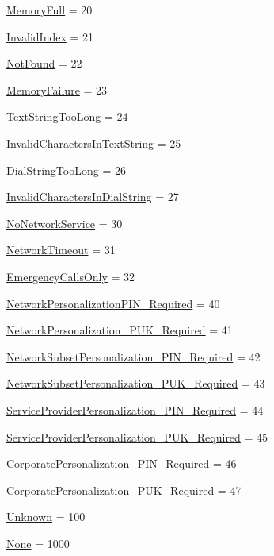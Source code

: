 \begin{DoxyCompactItemize}
\hyperlink{enum_8vala_a9c4b821e98068d17ab433a2059b86e65}{Memory\-Full} = 20
\item 
\hyperlink{enum_8vala_ad0eb959f723fbb1fde28d6c5f38f2bd7}{Invalid\-Index} = 21
\item 
\hyperlink{enum_8vala_a0cfc295e037d42309933d7471dcfd28e}{Not\-Found} = 22
\item 
\hyperlink{enum_8vala_a2a58ed09b8a8239b15d3a0e0c365c029}{Memory\-Failure} = 23
\item 
\hyperlink{enum_8vala_a98dcfca4d65c0e143c59a9669ea21787}{Text\-String\-Too\-Long} = 24
\item 
\hyperlink{enum_8vala_a6d5934c08a338c23fbf114f99193ec68}{Invalid\-Characters\-In\-Text\-String} = 25
\item 
\hyperlink{enum_8vala_a1d8e3c259a652e59cebc60a29ac496c5}{Dial\-String\-Too\-Long} = 26
\item 
\hyperlink{enum_8vala_a944e825978407f13a694783f06264b84}{Invalid\-Characters\-In\-Dial\-String} = 27
\item 
\hyperlink{enum_8vala_a941770a50c4e4f7a763fe278de42596a}{No\-Network\-Service} = 30
\item 
\hyperlink{enum_8vala_a4ab8d67ce74f17111c2c63028b724909}{Network\-Timeout} = 31
\item 
\hyperlink{enum_8vala_ad257fe2f6eb1d34148dad08c271622cd}{Emergency\-Calls\-Only} = 32
\item 
\hyperlink{enum_8vala_ac89259fa0400e5b5fca481767b0d5f2a}{Network\-Personalization\-P\-I\-N\-\_\-\-Required} = 40
\item 
\hyperlink{enum_8vala_a0e31e105ddf580bdb25c4e236bf5b7e8}{Network\-Personalization\-\_\-\-P\-U\-K\-\_\-\-Required} = 41
\item 
\hyperlink{enum_8vala_ab5e1eafc06b18ba9a01ff1303f6ac7d3}{Network\-Subset\-Personalization\-\_\-\-P\-I\-N\-\_\-\-Required} = 42
\item 
\hyperlink{enum_8vala_acdd77dc52889560a611220da02f98835}{Network\-Subset\-Personalization\-\_\-\-P\-U\-K\-\_\-\-Required} = 43
\item 
\hyperlink{enum_8vala_a66c3a62a24b73d4d11ca9db7fa460733}{Service\-Provider\-Personalization\-\_\-\-P\-I\-N\-\_\-\-Required} = 44
\item 
\hyperlink{enum_8vala_a255b6c1368460cd70e46ba73f3a130b9}{Service\-Provider\-Personalization\-\_\-\-P\-U\-K\-\_\-\-Required} = 45
\item 
\hyperlink{enum_8vala_ac770e4941e5a9f1d05516c55bf8b7693}{Corporate\-Personalization\-\_\-\-P\-I\-N\-\_\-\-Required} = 46
\item 
\hyperlink{enum_8vala_a7db526459a05087626906cb30d5dea1f}{Corporate\-Personalization\-\_\-\-P\-U\-K\-\_\-\-Required} = 47
\item 
\hyperlink{enum_8vala_a915d220aba4527d1e33010bdfcbc6855}{Unknown} = 100
\item 
\hyperlink{enum_8vala_ac7485dcc8d256a6f197ed7802687f252}{None} = 1000
\end{DoxyCompactItemize}


